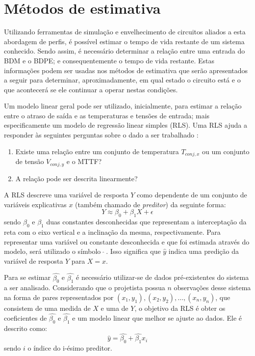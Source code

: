 \section{Métodos de estimativa}
\label{section_metodos_estimativa}
Utilizando ferramentas de simulação e envelhecimento de circuitos aliados a esta abordagem de perfis, é possível estimar o tempo de vida restante de um sistema conhecido. Sendo assim, é necessário determinar a relação entre uma entrada do BDM e o BDPE; e consequentemente o tempo de vida restante. Estas informações podem ser usadas nos métodos de estimativa que serão apresentados a seguir para determinar, aproximadamente, em qual estado o circuito está e o que acontecerá se ele continuar a operar nestas condições.

Um modelo linear geral \cite{McCullagh1984} pode ser utilizado, inicialmente, para estimar a relação entre o atraso de saída e as temperaturas e tensões de entrada; mais especificamente um modelo de regressão linear simples (RLS). Uma RLS ajuda a responder às seguintes perguntas sobre o dado a ser trabalhado \cite{James2013}:
\begin{enumerate}
	\item Existe uma relação entre um conjunto de temperatura $T_{conj,x}$ ou um conjunto de tensão $V_{conj,y}$ e o MTTF?
	\item A relação pode ser descrita linearmente?
\end{enumerate}
A RLS descreve uma variável de resposta $Y$ como dependente de um conjunto de variáveis explicativas $x$ (também chamado de \textit{preditor}) da seguinte forma:
\begin{equation}
\label{eq:regressao_linear_simples}
Y \approx \beta_0+\beta_1X + \epsilon
\end{equation}
sendo $\beta_0$ e $\beta_1$ duas constantes desconhecidas que representam a interceptação da reta com o eixo vertical e a inclinação da mesma, respectivamente. Para representar uma variável ou constante desconhecida e que foi estimada através do modelo, será utilizado o símbolo$\ $ $\hat{}$$\ $. Isso significa que $\hat{y}$ indica uma predição da variável de resposta $Y$ para $X = x$.

Para se estimar $\hat{\beta_0}$ e $\hat{\beta_1}$ é necessário utilizar-se de dados pré-existentes do sistema a ser analisado. Considerando que o projetista possua $n$ observações desse sistema na forma de pares representados por $(x_1,y_1),(x_2,y_2),\dots,(x_n,y_n)$, que consistem de uma medida de $X$ e uma de $Y$, o objetivo da RLS é obter os coeficientes de $\hat{\beta_0}$ e $\hat{\beta_1}$ e um modelo linear que melhor se ajuste ao dados. Ele é descrito como:
\begin{equation}
\label{eq:RLS_estimado}
\hat{y} =\hat{\beta_0}+\hat{\beta_1}x_i
\end{equation}
sendo $i$ o índice do i-ésimo preditor.

